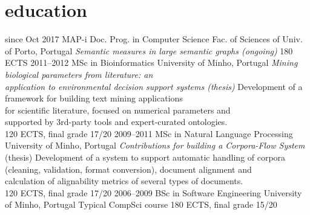 \documentclass[a4paper]{friggeri-cv}
\begin{document}
\newpage
\section{education}
\label{education}


\begin{entrylist}
  \entry
    {{\tiny since} Oct 2017}
    {MAP-i Doc. Prog. in Computer Science}
    {Fac. of Sciences of Univ. of Porto, Portugal}
    {\emph{Semantic measures in large semantic graphs (ongoing)}}
    {180 ECTS}
  \entry
    {2011--2012}
    {MSc in Bioinformatics}
    {University of Minho, Portugal}
    {\emph{Mining biological parameters from literature: an\\
    application to environmental decision support systems (thesis)}}
    {Development of a framework
    for building text mining applications\\
    for scientific literature, focused on numerical parameters and\\
    supported by 3rd-party tools and expert-curated
    ontologies.\\
    120 ECTS, final grade 17/20
    }
  \entry
    {2009--2011}
    {MSc in Natural Language Processing}
    {University of Minho, Portugal}
    {\emph{Contributions for building a Corpora-Flow System} (thesis)}
    {\footnotesize{Development of a system to support automatic handling of corpora\\
    (cleaning, validation, format conversion), document alignment and\\
    calculation of alignability metrics of several types of documents.}\\
    120 ECTS, final grade 17/20
    }
  \entry
    {2006--2009}
    {BSc in Software Engineering}
    {University of Minho, Portugal}
    {Typical CompSci course}
    {180 ECTS, final grade 15/20}
\end{entrylist}
\end{document}
